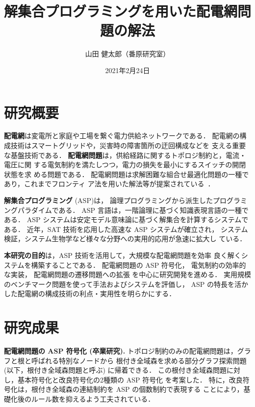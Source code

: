 \documentclass[a4j,10pt,dvipdfmx]{jarticle}
\title{解集合プログラミングを用いた配電網問題の解法}
\author{山田 健太郎（番原研究室）}
\date{2021年2月24日}
\begin{document}
\maketitle
\thispagestyle{empty}
\begin{multicols}{1}

\section{研究概要}
\textbf{配電網}は変電所と家庭や工場を繋ぐ電力供給ネットワークである．
配電網の構成技術はスマートグリッドや，災害時の障害箇所の迂回構成などを
支える重要な基盤技術である．
\textbf{配電網問題}は，供給経路に関するトポロジ制約と，電流・電圧に関
する電気制約を満たしつつ，電力の損失を最小にするスイッチの開閉状態を求
める問題である．
配電網問題は求解困難な組合せ最適化問題の一種であり，これまでフロンティ
ア法を用いた解法等が提案されている~\cite{Minato:dnet:ZDD}．

\textbf{解集合プログラミング}
(ASP)は，
論理プログラミングから派生したプログラミングパラダイムである．
ASP 言語は，一階論理に基づく知識表現言語の一種である．
ASP システムは安定モデル意味論に基づく解集合を計算するシステムである．
近年，SAT 技術を応用した高速な ASP システムが確立され，
システム検証，システム生物学など様々な分野への実用的応用が急速に拡大し
ている．

\textbf{本研究の目的}は，ASP 技術を活用して，大規模な配電網問題を効率
良く解くシステムを構築することである．
配電網問題の ASP 符号化，
電気制約の効率的な実装，
配電網問題の遷移問題への拡張
を中心に研究開発を進める．
実用規模のベンチマーク問題を使って手法およびシステムを評価し，
ASP の特長を活かした配電網の構成技術の利点・実用性を明らかにする．

\section{研究成果}
\textbf{配電網問題の ASP 符号化 (卒業研究).}
%
トポロジ制約のみの配電網問題は，グラフと根と呼ばれる特別なノードから
根付き全域森を求める部分グラフ探索問題(以下，根付き全域森問題と呼ぶ)
に帰着できる．
この根付き全域森問題に対し，基本符号化と改良符号化の2種類の ASP 符号化
を考案した．
特に，改良符号化は，根付き全域森の連結制約を ASP の個数制約で表現する
ことにより，基礎化後のルール数を抑えるよう工夫されている．


\end{multicols}
\end{document}
